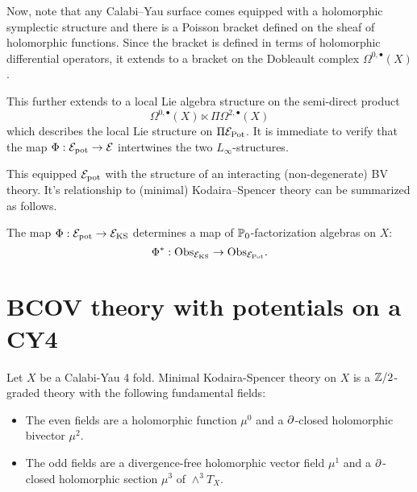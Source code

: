 \documentclass[11pt]{article}
\newcommand\bu{\bullet}
\begin{document}
Now, note that any Calabi--Yau surface comes equipped with a holomorphic symplectic structure and there is a Poisson bracket defined on the sheaf of holomorphic functions.
Since the bracket is defined in terms of holomorphic differential operators, it extends to a bracket on the Dobleault complex $\Omega^{0,\bu}(X)$.

This further extends to a local Lie algebra structure on the semi-direct product 
\[
\Omega^{0,\bu}(X) \ltimes \Pi \Omega^{2,\bu}(X)
\]
which describes the local Lie structure on $\Pi \mathcal{E}_{\rm Pot}$. 
It is immediate to verify that the map $\Phi : \mathcal{E}_{\rm pot} \to \mathcal{E}$ intertwines the two $L_\infty$-structures. 

This equipped $\mathcal{E}_{\rm pot}$ with the structure of an interacting (non-degenerate) BV theory. 
It's relationship to (minimal) Kodaira--Spencer theory can be summarized as follows. 

%

\begin{prop}
The map $\Phi : \mathcal{E}_{\rm pot} \to \mathcal{E}_{\rm KS}$ determines a map of $\mathbb{P}_0$-factorization algebras on $X$:
\[
\Phi^* : {\rm Obs}_{\mathcal{E}_{\rm KS}} \to {\rm Obs}_{\mathcal{E}_{\rm Pot}} .
\]
\end{prop}

\section{BCOV theory with potentials on a CY4}
\label{sec:org3d6a090}
Let \(X\) be a Calabi-Yau 4 fold. Minimal Kodaira-Spencer theory on $X$ is a $\mathbb{Z}/2$-graded theory with the following fundamental fields:
\begin{itemize}
\item The even fields are a holomorphic function $\mu^0$ and a $\partial$-closed holomorphic bivector $\mu^2$.
\item The odd fields are a divergence-free holomorphic vector field $\mu^1$ and a $\partial$-closed holomorphic section $\mu^3$ of $\wedge^3 T_X$. 
\end{itemize}

\end{document}
